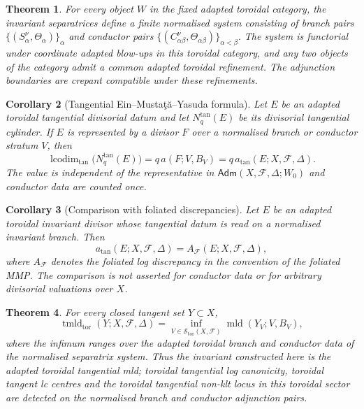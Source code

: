 \documentclass[11pt]{amsart}
\numberwithin{equation}{section}
\theoremstyle{plain}
\newtheorem{Theorem}{Theorem}[section]
\newtheorem{Corollary}[Theorem]{Corollary}
\theoremstyle{definition}
\newcommand{\mld}{\operatorname{mld}}
\newcommand{\tmldtor}{\operatorname{tmld}_{\mathrm{tor}}}
\newcommand{\lcodim}{\operatorname{lcodim}}
\newcommand{\Adm}{\mathsf{Adm}}
\newcommand{\AF}{A_{\mathcal F}}
\newcommand{\cF}{\mathcal F}
\begin{document}
\begin{Theorem}
\label{thm:intro-system}
For every object $W$ in the fixed adapted toroidal category, the invariant
separatrices define a finite normalised system consisting of branch pairs $
\{(S_\alpha^\nu,\Theta_\alpha)\}_\alpha
$
and conductor pairs
$
\{(C_{\alpha\beta}^\nu,\Theta_{\alpha\beta})\}_{\alpha<\beta}.$
The system is functorial under coordinate adapted blow-ups in this toroidal
category, and any two objects of the category admit a common adapted toroidal
refinement.  The adjunction boundaries are crepant compatible under these
refinements.
\end{Theorem}

\begin{Corollary}[Tangential Ein--Musta\c{t}\u{a}--Yasuda formula]
\label{thm:intro-emy}
Let $E$ be an adapted toroidal tangential divisorial datum and let
$N_q^{\tan}(E)$ be its divisorial tangential cylinder.  If $E$ is represented
by a divisor $F$ over a normalised branch or conductor stratum $V$, then
\[
\lcodim_{\tan}\bigl(N_q^{\tan}(E)\bigr)=q\,a(F;V,B_V)=q\,a_{\tan}(E;X,\cF,\Delta).
\]
The value is independent of the representative in $\Adm(X,\cF,\Delta;W_0)$
and conductor data are counted once.
\end{Corollary}

\begin{Corollary}[Comparison with foliated discrepancies]
\label{thm:intro-foliated-comparison}
Let $E$ be an adapted toroidal invariant divisor whose tangential datum is
read on a normalised invariant branch.  Then
\[
a_{\tan}(E;X,\cF,\Delta)=\AF(E;X,\cF,\Delta),
\]
where $\AF$ denotes the foliated log discrepancy in the convention of the
foliated MMP.  The comparison is not asserted for conductor data or for
arbitrary divisorial valuations over $X$.
\end{Corollary}

\begin{Theorem}
\label{thm:intro-ioa}
For every closed tangent set $Y\subset X$,
\[
\tmldtor(Y;X,\cF,\Delta)=
\inf_{V\in\mathcal S_{\mathrm{tor}}(X,\cF)}\mld(Y_V;V,B_V),
\]
where the infimum ranges over the adapted toroidal branch and conductor data
of the normalised separatrix system.  Thus the invariant constructed here is
the adapted toroidal tangential mld; toroidal tangential log canonicity,
toroidal tangent lc centres and the toroidal tangential non-klt locus in this
toroidal sector are detected on the normalised branch and conductor adjunction
pairs.
\end{Theorem}
\end{document}
